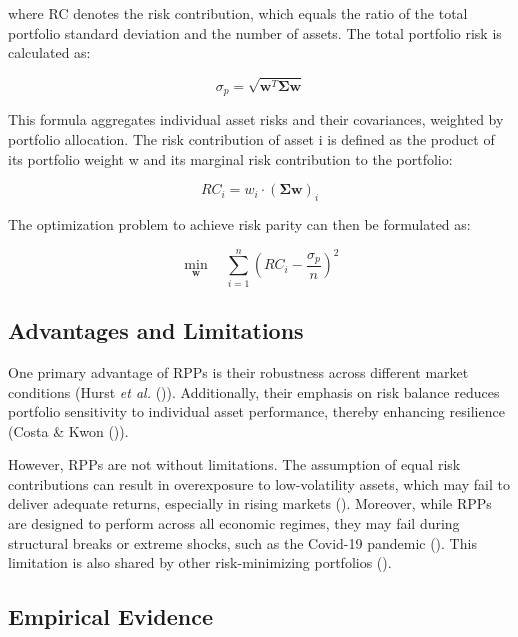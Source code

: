 \documentclass[11pt,preprint]{elsarticle}
\numberwithin{equation}{section}
\numberwithin{figure}{section}
\numberwithin{table}{section}
\begin{document}
where RC denotes the risk contribution, which equals the ratio of the
total portfolio standard deviation and the number of assets. The total
portfolio risk is calculated as:

\begin{equation}
\sigma_p = \sqrt{\mathbf{w}^T \boldsymbol{\Sigma} \mathbf{w}}
\end{equation}

This formula aggregates individual asset risks and their covariances,
weighted by portfolio allocation. The risk contribution of asset i is
defined as the product of its portfolio weight w and its marginal risk
contribution to the portfolio:

\begin{equation}
RC_i = w_i \cdot (\boldsymbol{\Sigma} \mathbf{w})_i 
\end{equation}

The optimization problem to achieve risk parity can then be formulated
as:

\begin{equation}
\min_{\mathbf{w}}  \quad \sum_{i=1}^n \left( RC_i - \frac{\sigma_p}{n} \right)^2 
\end{equation}

\subsection{Advantages and
Limitations}\label{advantages-and-limitations}

One primary advantage of RPPs is their robustness across different
market conditions (Hurst \emph{et al.}
()). Additionally, their
emphasis on risk balance reduces portfolio sensitivity to individual
asset performance, thereby enhancing resilience (Costa \& Kwon
()).

However, RPPs are not without limitations. The assumption of equal risk
contributions can result in overexposure to low-volatility assets, which
may fail to deliver adequate returns, especially in rising markets
().
Moreover, while RPPs are designed to perform across all economic
regimes, they may fail during structural breaks or extreme shocks, such
as the Covid-19 pandemic (). This limitation is also shared by other risk-minimizing
portfolios ().

\subsection{Empirical Evidence}\label{empirical-evidence}
\end{document}
